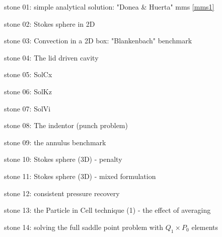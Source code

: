 \vspace{1cm}

{\small 

\noindent stone 01: simple analytical solution: "Donea \& Huerta" mms \ref{mms1} 


\noindent stone 02: Stokes sphere in 2D 


\noindent stone 03: Convection in a 2D box: "Blankenbach" benchmark \cite{blbc89}


\noindent stone 04: The lid driven cavity


\noindent stone 05: SolCx


\noindent stone 06: SolKz


\noindent stone 07: SolVi


\noindent stone 08: The indentor (punch problem) 


\noindent stone 09: the annulus benchmark 


\noindent stone 10: Stokes sphere (3D) - penalty


\noindent stone 11: Stokes sphere (3D) - mixed formulation


\noindent stone 12: consistent pressure recovery 


\noindent stone 13: the Particle in Cell technique (1) - the effect of averaging


\noindent stone 14: solving the full saddle point problem with $Q_1\times P_0$ elements 


}
